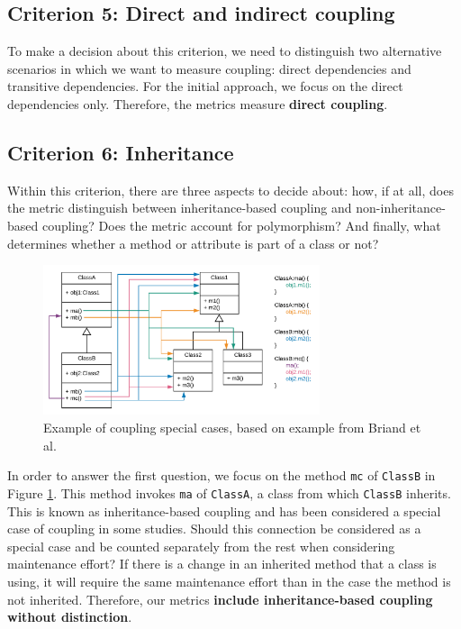 \documentclass[a4paper]{article}
\begin{document}
\subsection{Criterion 5: Direct and indirect coupling}
To make a decision about this criterion, we need to distinguish two alternative scenarios in which we want to measure coupling: direct dependencies and transitive dependencies. For the initial approach, we  focus on the direct dependencies only. Therefore, the metrics measure \textbf{direct coupling}.

\subsection{Criterion 6: Inheritance}
Within this criterion, there are three aspects to decide about: how, if at all, does the metric distinguish between inheritance-based coupling and non-inheritance-based coupling? Does the metric account for polymorphism? And finally, what determines whether a method or attribute is part of a class or not?

\begin{figure}[ht]
\begin{center}
\includegraphics[height=4.4cm]{img/specialcases.png}
\caption{Example of coupling special cases, based on example from Briand et al. \cite{briand1999unified}}
\label{fig:specialcases}
\end{center}
\end{figure}

In order to answer the first question, we focus on the method \texttt{mc} of \texttt{ClassB} in Figure \ref{fig:specialcases}. This method invokes \texttt{ma} of \texttt{ClassA}, a class from which \texttt{ClassB} inherits. This is known as inheritance-based coupling and has been considered a special case of coupling in some studies. Should this connection be considered as a special case and be counted separately from the rest when considering maintenance effort? If there is a change in an inherited method that a class is using, it will require the same maintenance effort than in the case the method is not inherited. Therefore, our metrics \textbf{include inheritance-based coupling without distinction}.
\end{document}
